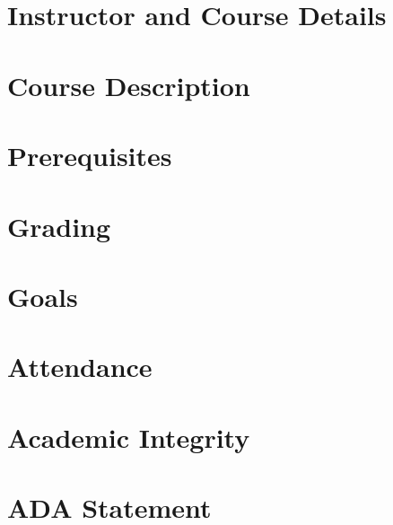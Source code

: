 \documentclass[11pt]{article} %
\title{\coursenumber\\\coursetitle}
\author{}
\date{\semester}
\begin{document}
\pagestyle{fancy} 
\fancyhead{}
\lhead{\coursenumber} %
\rhead{\semester} %

\maketitle

\thispagestyle{fancy}

\section*{Instructor and Course Details}

\section*{Course Description}

\section*{Prerequisites}

\section*{Grading}

\section*{Goals}

\section*{Attendance}

\section*{Academic Integrity}


\section*{ADA Statement}

\end{document}
